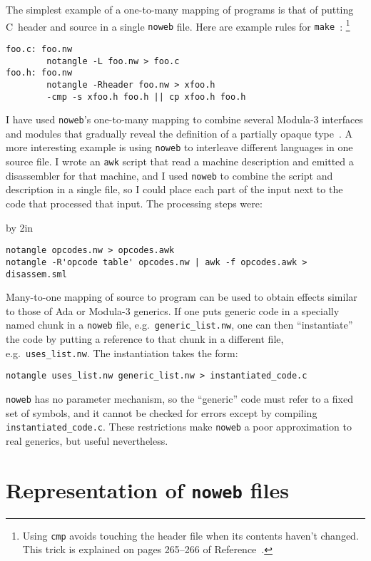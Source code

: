 The simplest example of a one-to-many mapping of programs is that of putting
C~header and source in a single {\tt noweb} file.
Here are example rules for {\tt make}~\cite{feldman:make}:%
\footnote{Using \verb+cmp+ avoids touching the header file when its contents
haven't changed.
This trick is explained on pages 265--266 of Reference~.}
\begin{verbatim}
foo.c: foo.nw
        notangle -L foo.nw > foo.c
foo.h: foo.nw
        notangle -Rheader foo.nw > xfoo.h
        -cmp -s xfoo.h foo.h || cp xfoo.h foo.h
\end{verbatim}
I have used {\tt noweb}'s one-to-many mapping to combine several Modula-3 interfaces and
modules that
gradually reveal the definition of a partially opaque
type~\cite[Chapter~6]{nelson:systems}. 
A more interesting example is using {\tt noweb} to
interleave different languages in one source file. 
I wrote an \verb+awk+
script that read a machine description and emitted a disassembler for
that machine, and I used {\tt noweb} to combine the script and description
in a single file, so I could place each part of the input next to the
code that processed that input. 
The processing steps were:
{\par\advance\hsize by 2in %
\begin{verbatim}
notangle opcodes.nw > opcodes.awk
notangle -R'opcode table' opcodes.nw | awk -f opcodes.awk > disassem.sml
\end{verbatim}
}

Many-to-one mapping of source to program can be used to obtain
effects similar to those of Ada or Modula-3 generics.
If one puts 
generic code in a specially named chunk in a \verb+noweb+
file, e.g.~\verb+generic_list.nw+, one can then
``instantiate'' the code by putting a reference to that chunk in a
different file, e.g.~\verb|uses_list.nw|.
The instantiation takes the form:
\begin{verbatim}
notangle uses_list.nw generic_list.nw > instantiated_code.c
\end{verbatim} 
{\tt noweb} has no parameter mechanism, so the ``generic'' code must
refer to a fixed set of symbols, and it cannot be checked for errors
except by compiling \verb+instantiated_code.c+.
These restrictions make {\tt noweb} a poor approximation to real
generics, but useful nevertheless.


\section{Representation of {\tt noweb} files}

